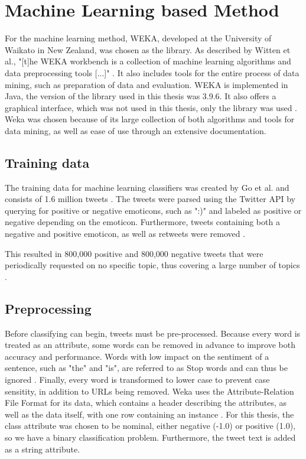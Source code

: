 \section{Machine Learning based Method}

For the machine learning method, WEKA, developed at the University of Waikato in New Zealand, was chosen as the library. As described by Witten et al., "[t]he WEKA workbench is a collection of machine learning algorithms and data preprocessing tools [...]" \cite[p.~7]{weka}. It also includes tools for the entire process of data mining, such as preparation of data and evaluation. WEKA is implemented in Java, the version of the library used in this thesis was 3.9.6. It also offers a graphical interface, which was not used in this thesis, only the library was used \cite{weka}. Weka was chosen because of its large collection of both algorithms and tools for data mining, as well as ease of use through an extensive documentation.

\subsection{Training data}
The training data for machine learning classifiers was created by Go et al. and consists of 1.6 million tweets \cite{GoBHaHua2009}. The tweets were parsed using the Twitter API by querying for positive or negative emoticons, such as ":)" and labeled as positive or negative depending on the emoticon. Furthermore, tweets containing both a negative and positive emoticon, as well as retweets were removed \cite{GoBHaHua2009}.

This resulted in 800,000 positive and 800,000 negative tweets that were periodically requested on no specific topic, thus covering a large number of topics \cite{GoBHaHua2009}.


\subsection{Preprocessing}
Before classifying can begin, tweets must be pre-processed. Because every word is treated as an attribute, some words can be removed in advance to improve both accuracy and performance. Words with low impact on the sentiment of a sentence, such as "the" and "is", are referred to as Stop words and can thus be ignored \cite{DBLP:journals/csur/GiachanouC16}. Finally, every word is transformed to lower case to prevent case sensitity, in addition to URLs being removed. Weka uses the Attribute-Relation File Format for its data, which contains a header describing the attributes, as well as the data itself, with one row containing an instance \cite{weka}. For this thesis, the class attribute was chosen to be nominal, either negative (-1.0) or positive (1.0), so we have a binary classification problem. Furthermore, the tweet text is added as a string attribute.

